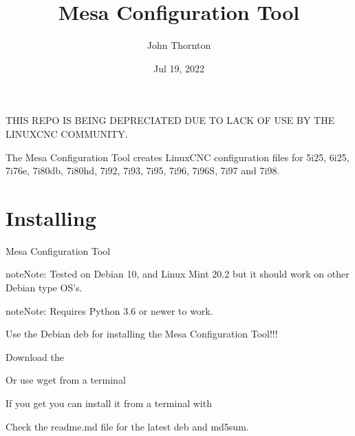 \documentclass[letterpaper,10pt,english,openany,oneside]{sphinxmanual}
\title{Mesa Configuration Tool}
\date{Jul 19, 2022}
\author{John Thornton}
\begin{document}
\pagestyle{empty}
\sphinxmaketitle
\pagestyle{plain}
\sphinxtableofcontents
\pagestyle{normal}
\label{\detokenize{index::doc}}


THIS REPO IS BEING DEPRECIATED DUE TO LACK OF USE BY THE LINUXCNC COMMUNITY.

The Mesa Configuration Tool creates LinuxCNC configuration files for
5i25, 6i25, 7i76e, 7i80db, 7i80hd, 7i92, 7i93, 7i95, 7i96, 7i96S, 7i97
and 7i98.


\chapter{Installing}
\label{\detokenize{install:installing}}\label{\detokenize{install::doc}}
Mesa Configuration Tool

\begin{sphinxadmonition}{note}{Note:}
Tested on Debian 10, and Linux Mint 20.2 but it should work on
other Debian type OS’s.
\end{sphinxadmonition}

\begin{sphinxadmonition}{note}{Note:}
Requires Python 3.6 or newer to work.
\end{sphinxadmonition}

Use the Debian deb for installing the Mesa Configuration Tool!!!

Download the 

Or use wget from a terminal

\begin{sphinxVerbatim}[commandchars=\\\{\}]
 
\end{sphinxVerbatim}

If you get  you can install it from a terminal with

\begin{sphinxVerbatim}[commandchars=\\\{\}]
   
\end{sphinxVerbatim}

Check the readme.md file for the latest deb and md5sum.
\end{document}
